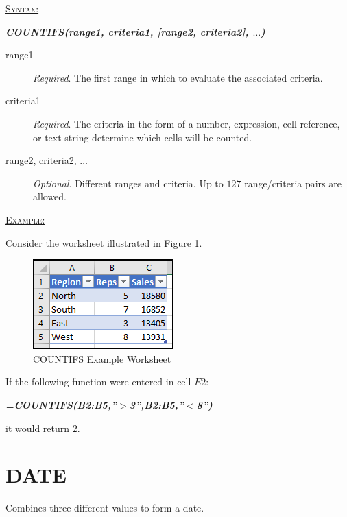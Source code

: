 \begin{addmargin}[1cm]{0cm}

	\medskip
	\underline{\textsc{Syntax:}}
	\medskip

	{\color{Syntax}
		\noindent\textbf{\textit{COUNTIFS(range1, criteria1, [range2, criteria2], $\ldots$)}}
	}
	
	\begin{description}
		\item[range1] \textit{Required}. The first range in which to evaluate the associated criteria.
		\item[criteria1] \textit{Required}. The criteria in the form of a number, expression, cell reference, or text string determine which cells will be counted.
		\item[range2, criteria2, $\ldots$] \textit{Optional}. Different ranges and criteria. Up to $ 127 $ range/criteria pairs are allowed.
	\end{description}

	\medskip
	\noindent\underline{\textsc{Example:}}
	\medskip
	
	\noindent Consider the worksheet illustrated in Figure \ref{apa:cfs}.

	\begin{figure}[H]
		\centering
		\includegraphics[width=\maxwidth{.45\linewidth}]{gfx/apa_fig01}
		\caption{COUNTIFS Example Worksheet}
		\label{apa:cfs}
	\end{figure}
	
	\noindent If the following function were entered in cell $ E2 $:
	
	{\color{Syntax}
		\textit{\textbf{=COUNTIFS(B2:B5,''$ > $3'',B2:B5,''$ < $8'')}}
	}
	
	\noindent it would return $ 2 $.

\end{addmargin}

\section{DATE}

Combines three different values to form a date.


